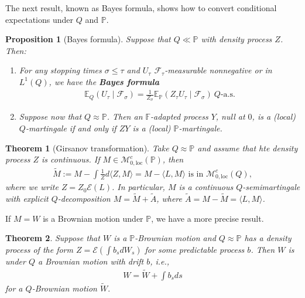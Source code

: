 \documentclass[12pt,a4paper, twoside]{article}
\newtheorem{thm}{Theorem}[section]
\newtheorem{prop}{Proposition}[section]
\theoremstyle{definition}
\newcommand{\EE}{\mathbb{E}} %
\newcommand{\PP}{\mathbb{P}} %
\begin{document}
\newpage
The next result, known as Bayes formula, shows how to convert conditional expectations under $Q$ and $\PP$. 
\begin{prop}[Bayes formula] Suppose that $Q \ll \PP$ with density process $Z$. Then:
\begin{enumerate}
\item For any stopping times $\sigma \leq \tau$ and $U_\tau$ $\mathcal{F}_\tau$-measurable nonnegative or in $L^1(Q)$, we have the \textbf{Bayes formula} 
\begin{align*}
\EE_Q(U_\tau \mid \mathcal{F}_\sigma) = \frac{1}{Z_\sigma} \EE_\PP( Z_\tau U_\tau \mid \mathcal{F}_\sigma) \ Q\text{-a.s.}
\end{align*}
\item Suppose now that $Q \approx \PP$. Then an $\mathbb{F}$-adapted process $Y$, null at $0$, is a (local) $Q$-martingale if and only if $ZY$ is a (local) $\PP$-martingale. 
\end{enumerate}
\end{prop}
\begin{thm}[Girsanov transformation] Take $Q \approx \PP$ and assume that hte density process $Z$ is continuous. If $M \in \mathcal{M}_{0, \text{loc}}^c( \PP)$, then 
\begin{align*}
\widetilde{M}:= M - \int \frac{1}{Z}d \langle Z, M \rangle = M - \langle L, M \rangle \text{ is in } \mathcal{M}_{0, \text{loc}}^c( Q),
\end{align*}
where we write $Z = Z_0 \mathcal{E}(L)$. In particular, $M$ is a continuous $Q$-semimartingale with explicit $Q$-decomposition $M= \widetilde{M} + \widetilde{A}$, where $\widetilde{A}= M- \widetilde{M}= \langle L, M \rangle$. 
\end{thm}
If $M=W$ is a Brownian motion under $\PP$, we have a more precise result.
\begin{thm} Suppose that $W$ is a $\PP$-Brownian motion and $Q \approx \PP$ has a density process of the form $Z = \mathcal{E}\left( \int b_s dW_s \right)$ for some predictable process $b$. Then $W$ is under $Q$ a Brownian motion with drift $b$,  i.e., 
\begin{align*}
W = \widetilde{W} + \int b_s ds
\end{align*}
for a $Q$-Brownian motion $\widetilde{W}.$
\end{thm}
\newpage
\end{document}

